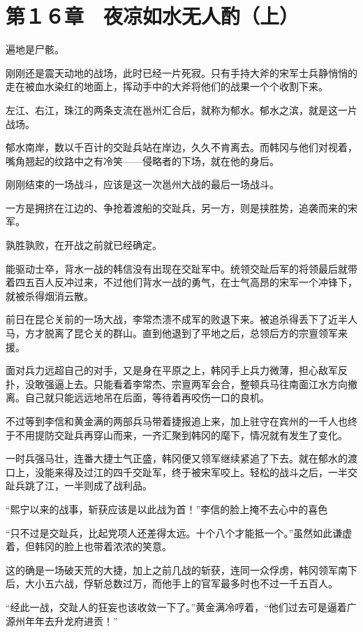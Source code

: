 \section{第１６章　夜凉如水无人酌（上）}

遍地是尸骸。

刚刚还是震天动地的战场，此时已经一片死寂。只有手持大斧的宋军士兵静悄悄的走在被血水染红的地面上，挥动手中的大斧将他们的战果一个个收割下来。

左江、右江，珠江的两条支流在邕州汇合后，就称为郁水。郁水之滨，就是这一片战场。

郁水南岸，数以千百计的交趾兵站在岸边，久久不肯离去。而韩冈与他们对视着，嘴角翘起的纹路中之有冷笑——侵略者的下场，就在他的身后。

刚刚结束的一场战斗，应该是这一次邕州大战的最后一场战斗。

一方是拥挤在江边的、争抢着渡船的交趾兵，另一方，则是挟胜势，追袭而来的宋军。

孰胜孰败，在开战之前就已经确定。

能驱动士卒，背水一战的韩信没有出现在交趾军中。统领交趾后军的将领最后就带着四五百人反冲过来，不过他们背水一战的勇气，在士气高昂的宋军一个冲锋下，就被杀得烟消云散。

前日在昆仑关前的一场大战，李常杰溃不成军的败退下来。被追杀得丢下了近半人马，方才脱离了昆仑关的群山。直到他退到了平地之后，总领后方的宗亶领军来援。

面对兵力远超自己的对手，又是身在平原之上，韩冈手上兵力微薄，担心敌军反扑，没敢强逼上去。只能看着李常杰、宗亶两军会合，整顿兵马往南面江水方向撤离。自己就只能远远地吊在后面，等待着再咬伤一口的良机。

不过等到李信和黄金满的两部兵马带着捷报追上来，加上驻守在宾州的一千人也终于不用提防交趾兵再穿山而来，一齐汇聚到韩冈的麾下，情况就有发生了变化。

一时兵强马壮，连番大捷士气正盛，韩冈便又领军继续紧追了下去。就在郁水的渡口上，没能来得及过江的四千交趾军，终于被宋军咬上。轻松的战斗之后，一半交趾兵跳了江，一半则成了战利品。

“熙宁以来的战事，斩获应该是以此战为首！”李信的脸上掩不去心中的喜色

“只不过是交趾兵，比起党项人还差得太远。十个八个才能抵一个。”虽然如此谦虚着，但韩冈的脸上也带着浓浓的笑意。

这的确是一场破天荒的大捷，加上之前几战的斩获，连同一众俘虏，韩冈领军南下后，大小五六战，俘斩总数过万，而他手上的官军最多时也不过一千五百人。

“经此一战，交趾人的狂妄也该收敛一下了。”黄金满冷哼着，“他们过去可是逼着广源州年年去升龙府进贡！”

